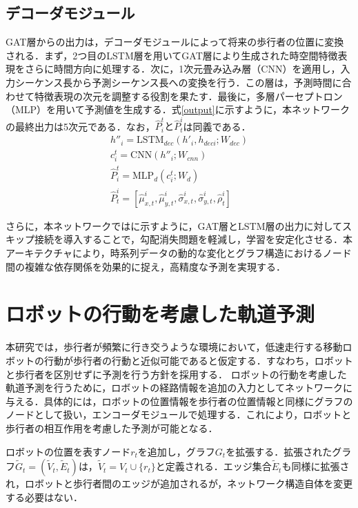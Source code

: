 \subsection{デコーダモジュール}\label{sec:decoder}
GAT層からの出力は，デコーダモジュールによって将来の歩行者の位置に変換される．まず，2つ目のLSTM層を用いてGAT層により生成された時空間特徴表現をさらに時間方向に処理する．次に，1次元畳み込み層（CNN）を適用し，入力シーケンス長から予測シーケンス長への変換を行う．この層は，予測時間に合わせて特徴表現の次元を調整する役割を果たす．最後に，多層パーセプトロン（MLP）を用いて予測値を生成する．式\eqref{output}に示すように，本ネットワークの最終出力は5次元である．なお，$\hat{P}^t_i\text{と}\hat{P}^i_t$は同義である．
\begin{align}
  h''_i = \text{LSTM}_{dec}(h'_i, h_{deci}; W_{dec})\\
  c^t_i = \text{CNN}(h''_i; W_{cnn}) \\
  \hat{P}^t_i = \text{MLP}_{d}(c^t_i; W_{d}) \\
  \hat{P}^i_t = [\hat{\mu}^i_{x,t}, \hat{\mu}^i_{y, t}, \hat{\sigma}^i_{x, t}, \hat{\sigma}^i_{y, t}, \hat{\rho}^i_t] \label{output}
\end{align}

さらに，本ネットワークではに示すように，GAT層とLSTM層の出力に対してスキップ接続\cite{he2016deep-resnet}を導入することで，勾配消失問題\cite{hochreiter2001gradient-grad,weinleindiplomarbeit-grad, schmidhuber2015deep-grad}を軽減し，学習を安定化させる．本アーキテクチャにより，時系列データの動的な変化とグラフ構造におけるノード間の複雑な依存関係を効果的に捉え，高精度な予測を実現する．

\section{ロボットの行動を考慮した軌道予測}
本研究では，歩行者が頻繁に行き交うような環境において，低速走行する移動ロボットの行動が歩行者の行動と近似可能であると仮定する．すなわち，ロボットと歩行者を区別せずに予測を行う方針を採用する．
ロボットの行動を考慮した軌道予測を行うために，ロボットの経路情報を追加の入力としてネットワークに与える．具体的には，ロボットの位置情報を歩行者の位置情報と同様にグラフのノードとして扱い，エンコーダモジュールで処理する．これにより，ロボットと歩行者の相互作用を考慮した予測が可能となる．

ロボットの位置を表すノード$r_t$を追加し，グラフ$G_t$を拡張する．拡張されたグラフ$\tilde{G}_t = (\tilde{V}_t, \tilde{E}_t)$は，$\tilde{V}_t = V_t \cup \{ r_t \}$と定義される．エッジ集合$\tilde{E}_t$も同様に拡張され，ロボットと歩行者間のエッジが追加されるが，ネットワーク構造自体を変更する必要はない．

